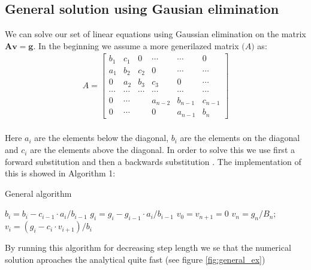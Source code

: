 \documentclass[american,a4paper,12pt]{article}
\renewcommand{\vec}[1]{\mathbf{#1}} %
\begin{document}
\subsection{General solution using Gausian elimination}
We can solve our set of linear equations using Gaussian elimination on the matrix $\vec{A}\vec{v} = \vec{g}$. In the beginning we assume a more generilazed matrix $\vec(A)$ as:
\begin{align*}
  A =
  \begin{bmatrix}
    b_1 & c_1 & 0 & \cdots & \cdots & 0 \\
    a_1 & b_2 & c_2 & 0 & \cdots & \cdots \\
    0 & a_2 & b_3 & c_3 & 0 & \cdots \\
    \cdots & \cdots & \cdots & \cdots & \cdots & \cdots \\
    0 & \cdots & & a_{n-2} & b_{n-1} & c_{n-1} \\
    0 & \cdots & & 0 & a_{n-1} & b_n
  \end{bmatrix}
\end{align*}
\\ Here $a_i$ are the elements below the diagonal, $b_i$ are the elements on the diagonal and $c_i$ are the elements above the diagonal. In order to solve this we use first a forward substitution and then a backwards substitution \cite{linalg}. The implementation of this is showed in Algorithm 1:
\begin{algorithm}[H]
\caption{General algorithm}
\begin{algorithmic}[1] %
   
    \State $b_i = b_i - c_{i-1}\cdot {a_i}/{{b}_{i-1}}$ 
    \State $g_i = g_i - {g}_{i-1}\cdot {a_i}/{{b}_{i-1}}$ 
  \EndFor
  \Statex
  \State $v_0 = v_{n+1} = 0$ 
  \State $v_n = g_n/B_n;$
    \State $v_i = (g_i - c_i\cdot v_{i+1})/b_i$ %
  \EndFor
\end{algorithmic}
\end{algorithm}
By running this algorithm for decreasing step length we se that the numerical solution aproaches the analytical quite fast (see figure \ref{fig:general_ex})
\end{document}
